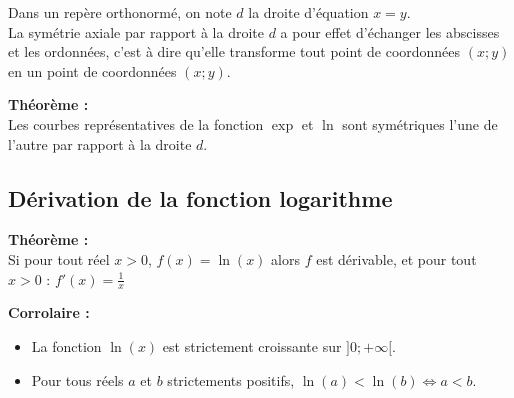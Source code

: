 \documentclass[11pt,a4paper]{article}
\begin{document}
\begin{minipage}{0.5\textwidth}
    Dans un repère orthonormé, on note $d$ la droite d'équation $x=y$.\\
La symétrie axiale par rapport à la droite $d$ a pour effet d'échanger les abscisses et les ordonnées, c'est à dire
qu'elle transforme tout point de coordonnées $(x;y)$ en un point de coordonnées $(x;y)$. \\

\begin{mdframed}[style=proprieteStyle]
    \textbf{Théorème :} ~\\
    Les courbes représentatives de la fonction $\exp$ et $\ln$ sont symétriques l'une de l'autre par rapport à la droite $d$.
\end{mdframed}
\end{minipage}
\hfill
\begin{minipage}{0.4\textwidth}
\end{minipage}

\subsection{Dérivation de la fonction logarithme}

\begin{mdframed}[style=proprieteStyle]
    \textbf{Théorème :} ~\\
    Si pour tout réel $x>0$, $f(x)=\ln(x)$ alors $f$ est dérivable, et pour tout $x>0$ : $\displaystyle f'(x)=\frac{1}{x}$
\end{mdframed}

\begin{mdframed}[style=proprieteStyle]
    \textbf{Corrolaire :}
    \begin{itemize}
        \vspace{-4pt}
        \item La fonction $\ln(x)$ est strictement croissante sur $]0;+\infty[$.
        \item Pour tous réels $a$ et $b$ strictements positifs, $\ln(a)<\ln(b)\Leftrightarrow a<b$.
    \end{itemize}
\end{mdframed}
\end{document}
